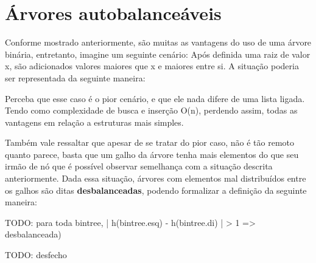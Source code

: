 \chapter{Árvores autobalanceáveis}
\label{ch:auto_bal} %

%
Conforme mostrado anteriormente, são muitas as vantagens do uso de uma árvore binária, entretanto, imagine um seguinte cenário: Após definida uma raiz de valor x, são adicionados valores maiores que x e maiores entre si. A situação poderia ser representada da seguinte maneira:


Perceba que esse caso é o pior cenário, e que ele nada difere de uma lista ligada. Tendo como complexidade de busca e inserção O(n), perdendo assim, todas as vantagens em relação a estruturas mais simples.

Também vale ressaltar que apesar de se tratar do pior caso, não é tão remoto quanto parece, basta que um galho da árvore tenha mais elementos do que seu irmão de nó que é possível observar semelhança com a situação descrita anteriormente. Dada essa situação, árvores com elementos mal distribuídos entre os galhos são ditas \textbf{desbalanceadas}, podendo formalizar a definição da seguinte maneira:

TODO: para toda bintree, | h(bintree.esq) - h(bintree.di) | > 1 => desbalanceada)

TODO: desfecho


\newpage


\newpage
